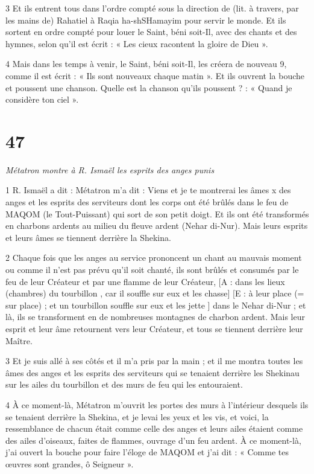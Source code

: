 \par 3 Et ils entrent tous dans l'ordre compté sous la direction de (lit. à travers, par les mains de) Rahatiel à Raqia ha-shSHamayim pour servir le monde. Et ils sortent en ordre compté pour louer le Saint, béni soit-Il, avec des chants et des hymnes, selon qu'il est écrit : « Les cieux racontent la gloire de Dieu ».

\par 4 Mais dans les temps à venir, le Saint, béni soit-Il, les créera de nouveau 9, comme il est écrit : « Ils sont nouveaux chaque matin ». Et ils ouvrent la bouche et poussent une chanson. Quelle est la chanson qu'ils poussent ? : « Quand je considère ton ciel ».

\chapter{47}

\par \textit{Métatron montre à R. Ismaël les esprits des anges punis}

\par 1 R. Ismaël a dit : Métatron m'a dit : Viens et je te montrerai les âmes x des anges et les esprits des serviteurs dont les corps ont été brûlés dans le feu de MAQOM (le Tout-Puissant) qui sort de son petit doigt. Et ils ont été transformés en charbons ardents au milieu du fleuve ardent (Nehar di-Nur). Mais leurs esprits et leurs âmes se tiennent derrière la Shekina.

\par 2 Chaque fois que les anges au service prononcent un chant au mauvais moment ou comme il n'est pas prévu qu'il soit chanté, ils sont brûlés et consumés par le feu de leur Créateur et par une flamme de leur Créateur, [A : dans les lieux (chambres) du tourbillon , car il souffle sur eux et les chasse] [E : à leur place (= sur place) ; et un tourbillon souffle sur eux et les jette ] dans le Nehar di-Nur ; et là, ils se transforment en de nombreuses montagnes de charbon ardent. Mais leur esprit et leur âme retournent vers leur Créateur, et tous se tiennent derrière leur Maître.

\par 3 Et je suis allé à ses côtés et il m'a pris par la main ; et il me montra toutes les âmes des anges et les esprits des serviteurs qui se tenaient derrière les Shekinau sur les ailes du tourbillon et des murs de feu qui les entouraient.

\par 4 À ce moment-là, Métatron m'ouvrit les portes des murs à l'intérieur desquels ils se tenaient derrière la Shekina, et je levai les yeux et les vis, et voici, la ressemblance de chacun était comme celle des anges et leurs ailes étaient comme des ailes d'oiseaux, faites de flammes, ouvrage d'un feu ardent. À ce moment-là, j’ai ouvert la bouche pour faire l’éloge de MAQOM et j’ai dit : « Comme tes œuvres sont grandes, ô Seigneur ».

